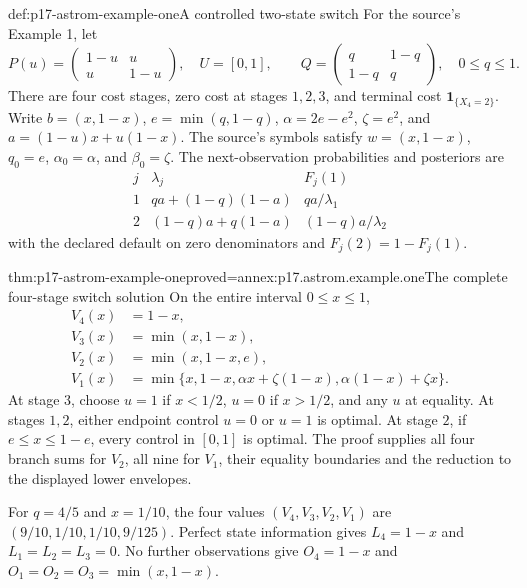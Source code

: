 \begin{hbdefinition}{def:p17-astrom-example-one}{A controlled two-state switch}
For the source's Example 1, let
\[
 P(u)=\begin{pmatrix}1-u&u\\u&1-u\end{pmatrix},
 \quad U=[0,1],\qquad
 Q=\begin{pmatrix}q&1-q\\1-q&q\end{pmatrix},
 \quad 0\leq q\leq1.
\]
There are four cost stages, zero cost at stages \(1,2,3\),
and terminal cost \(\mathbf1_{\{X_4=2\}}\).
Write \(b=(x,1-x)\), \(e=\min(q,1-q)\),
\(\alpha=2e-e^2\), \(\zeta=e^2\), and
\(a=(1-u)x+u(1-x)\).
The source's symbols satisfy
\(w=(x,1-x)\), \(q_0=e\), \(\alpha_0=\alpha\), and \(\beta_0=\zeta\).
The next-observation probabilities and posteriors are
\[
 \begin{array}{c|c|c}
 j&\lambda_j&F_j(1)\\ \hline
 1&qa+(1-q)(1-a)&qa/\lambda_1\\
 2&(1-q)a+q(1-a)&(1-q)a/\lambda_2
 \end{array}
\]
with the declared default on zero denominators and
\(F_j(2)=1-F_j(1)\).
\end{hbdefinition}

\begin{hbtheorem}{thm:p17-astrom-example-one}{proved=annex:p17.astrom.example.one}{The complete four-stage switch solution}
On the entire interval \(0\leq x\leq1\),
\[
 \begin{split}
 V_4(x)&=1-x,\\
 V_3(x)&=\min(x,1-x),\\
 V_2(x)&=\min(x,1-x,e),\\
 V_1(x)&=\min\{x,1-x,\alpha x+\zeta(1-x),
                              \alpha(1-x)+\zeta x\}.
 \end{split}
\]
At stage \(3\), choose \(u=1\) if \(x<1/2\), \(u=0\)
if \(x>1/2\), and any \(u\) at equality.
At stages \(1,2\), either endpoint control \(u=0\) or \(u=1\)
is optimal. At stage \(2\), if \(e\leq x\leq1-e\),
every control in \([0,1]\) is optimal.
The proof supplies all four branch sums for \(V_2\), all
nine for \(V_1\), their equality boundaries and the reduction
to the displayed lower envelopes.

For \(q=4/5\) and \(x=1/10\), the four values
\((V_4,V_3,V_2,V_1)\) are
\((9/10,1/10,1/10,9/125)\).
Perfect state information gives \(L_4=1-x\) and
\(L_1=L_2=L_3=0\).
No further observations give \(O_4=1-x\) and
\(O_1=O_2=O_3=\min(x,1-x)\).
\end{hbtheorem}


